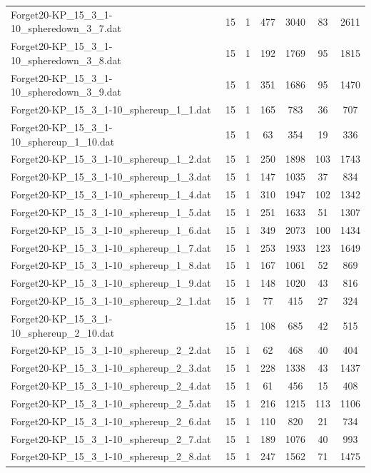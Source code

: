 \begin{table}[!ht]
\begin{tabular}{lcccccc}
Forget20-KP\_15\_3\_1-10\_spheredown\_3\_7.dat & 15 & 1 & 477 & 3040 & 83 & 2611 \\
Forget20-KP\_15\_3\_1-10\_spheredown\_3\_8.dat & 15 & 1 & 192 & 1769 & 95 & 1815 \\
Forget20-KP\_15\_3\_1-10\_spheredown\_3\_9.dat & 15 & 1 & 351 & 1686 & 95 & 1470 \\
Forget20-KP\_15\_3\_1-10\_sphereup\_1\_1.dat & 15 & 1 & 165 & 783 & 36 & 707 \\
Forget20-KP\_15\_3\_1-10\_sphereup\_1\_10.dat & 15 & 1 & 63 & 354 & 19 & 336 \\
Forget20-KP\_15\_3\_1-10\_sphereup\_1\_2.dat & 15 & 1 & 250 & 1898 & 103 & 1743 \\
Forget20-KP\_15\_3\_1-10\_sphereup\_1\_3.dat & 15 & 1 & 147 & 1035 & 37 & 834 \\
Forget20-KP\_15\_3\_1-10\_sphereup\_1\_4.dat & 15 & 1 & 310 & 1947 & 102 & 1342 \\
Forget20-KP\_15\_3\_1-10\_sphereup\_1\_5.dat & 15 & 1 & 251 & 1633 & 51 & 1307 \\
Forget20-KP\_15\_3\_1-10\_sphereup\_1\_6.dat & 15 & 1 & 349 & 2073 & 100 & 1434 \\
Forget20-KP\_15\_3\_1-10\_sphereup\_1\_7.dat & 15 & 1 & 253 & 1933 & 123 & 1649 \\
Forget20-KP\_15\_3\_1-10\_sphereup\_1\_8.dat & 15 & 1 & 167 & 1061 & 52 & 869 \\
Forget20-KP\_15\_3\_1-10\_sphereup\_1\_9.dat & 15 & 1 & 148 & 1020 & 43 & 816 \\
Forget20-KP\_15\_3\_1-10\_sphereup\_2\_1.dat & 15 & 1 & 77 & 415 & 27 & 324 \\
Forget20-KP\_15\_3\_1-10\_sphereup\_2\_10.dat & 15 & 1 & 108 & 685 & 42 & 515 \\
Forget20-KP\_15\_3\_1-10\_sphereup\_2\_2.dat & 15 & 1 & 62 & 468 & 40 & 404 \\
Forget20-KP\_15\_3\_1-10\_sphereup\_2\_3.dat & 15 & 1 & 228 & 1338 & 43 & 1437 \\
Forget20-KP\_15\_3\_1-10\_sphereup\_2\_4.dat & 15 & 1 & 61 & 456 & 15 & 408 \\
Forget20-KP\_15\_3\_1-10\_sphereup\_2\_5.dat & 15 & 1 & 216 & 1215 & 113 & 1106 \\
Forget20-KP\_15\_3\_1-10\_sphereup\_2\_6.dat & 15 & 1 & 110 & 820 & 21 & 734 \\
Forget20-KP\_15\_3\_1-10\_sphereup\_2\_7.dat & 15 & 1 & 189 & 1076 & 40 & 993 \\
Forget20-KP\_15\_3\_1-10\_sphereup\_2\_8.dat & 15 & 1 & 247 & 1562 & 71 & 1475 \\

\end{tabular}
\end{table}
